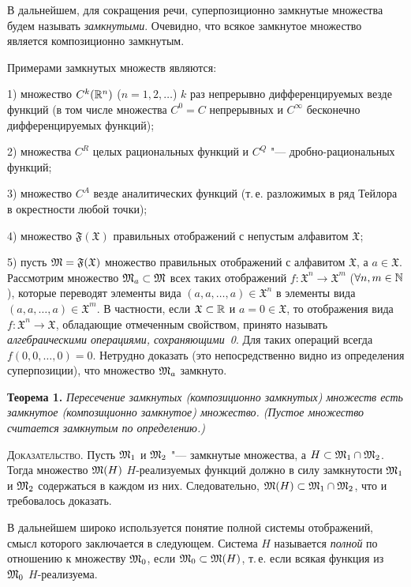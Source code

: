 В дальнейшем, для сокращения речи, суперпозиционно замкнутые множества
будем называть \emph{замкнутыми}. Очевидно, что всякое замкнутое множество
является композиционно замкнутым.

Примерами замкнутых множеств являются:

1) множество $C^k(\mathbb R^n)$ ($n=1,2,\dots$) $k$ раз непрерывно
дифференцируемых везде функций (в том числе множества $C^0=C$ непрерывных
и $C^\infty$ бесконечно дифференцируемых функций);

2) множества $C^R$ целых рациональных функций и $C^Q$ "---
дробно-рациональных функций;

3) множество $C^A$ везде аналитических функций (т.\,е. разложимых в ряд
Тейлора в окрестности любой точки);

4) множество $\mathfrak F(\mathfrak X)$ правильных отображений с непустым
алфавитом $\mathfrak X$;

5) пусть $\mathfrak M=\mathfrak F(\mathfrak X)$ множество правильных отображений
с алфавитом $\mathfrak X$, а $a\in\mathfrak X$. Рассмотрим множество
$\mathfrak M_a\subset\mathfrak M$ всех таких отображений
$f\colon\mathfrak X^n\to\mathfrak X^m$ ($\forall n,m\in\mathbb N$), которые
переводят элементы вида $(a,a,\dots,a)\in\mathfrak X^n$ в элементы вида
$(a,a,\dots,a)\in\mathfrak X^m$. В частности, если $\mathfrak X\subset\mathbb R$
и $a=0\in\mathfrak X$, то отображения вида $f\colon\mathfrak X^n\to\mathfrak X$,
обладающие отмеченным свойством, принято называть \emph{алгебраическими
операциями, сохраняющими~0}. Для таких операций всегда $f(0,0,\dots,0)=0$.
Нетрудно доказать (это непосредственно видно из определения суперпозиции),
что множество $\mathfrak M_a$ замкнуто.

\textbf{Теорема 1.} \emph{Пересечение замкнутых (композиционно
замкнутых) множеств есть замкнутое (композиционно замкнутое) множество.
(Пустое множество считается замкнутым по определению.)}

\textsc{Доказательство.} Пусть $\mathfrak M_1$ и $\mathfrak M_2$ "--- замкнутые множества,
а $H\subset\mathfrak M_1\cap\mathfrak M_2$. Тогда множество $\mathfrak M(H)$ $H$-реализуемых функций
должно в силу замкнутости $\mathfrak M_1$ и $\mathfrak M_2$ содержаться в каждом из них.
Следовательно, $\mathfrak M(H)\subset\mathfrak M_1\cap\mathfrak M_2$, что и требовалось доказать.

В дальнейшем широко используется понятие полной системы отображений, смысл
которого заключается в следующем. Система $H$ называется \emph{полной} по
отношению к множеству $\mathfrak M_0$, если $\mathfrak M_0\subset\mathfrak M(H)$, т.\,е. если всякая
функция из $\mathfrak M_0$ $H$-реализуема.

